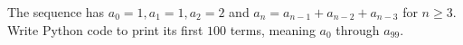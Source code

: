 The sequence has $a_0=1,a_1=1,a_2=2$ and $a_n=a_{n-1}+a_{n-2}+a_{n-3}$ for $n\ge3$. Write Python code to print its first $100$ terms, meaning $a_0$ through $a_{99}$.
